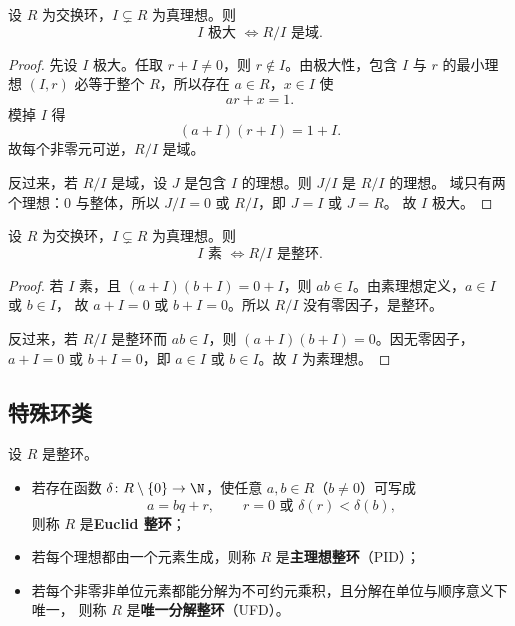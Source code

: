 \begin{theorem}
设 $R$ 为交换环，$I\subsetneq R$ 为真理想。则
\begin{equation}
  I\text{ 极大 } \iff R/I \text{ 是域}.
\end{equation}
\end{theorem}

\begin{proof}
先设 $I$ 极大。任取 $r+I\neq 0$，则 $r\notin I$。由极大性，包含 $I$ 与 $r$ 的最小理想
$(I,r)$ 必等于整个 $R$，所以存在 $a\in R$，$x\in I$ 使
\[
  ar+x=1.
\]
模掉 $I$ 得
\[
  (a+I)(r+I)=1+I.
\]
故每个非零元可逆，$R/I$ 是域。

反过来，若 $R/I$ 是域，设 $J$ 是包含 $I$ 的理想。则 $J/I$ 是 $R/I$ 的理想。
域只有两个理想：$0$ 与整体，所以 $J/I=0$ 或 $R/I$，即 $J=I$ 或 $J=R$。
故 $I$ 极大。
\end{proof}

\begin{theorem}
设 $R$ 为交换环，$I\subsetneq R$ 为真理想。则
\begin{equation}
  I\text{ 素 } \iff R/I \text{ 是整环}.
\end{equation}
\end{theorem}

\begin{proof}
若 $I$ 素，且 $(a+I)(b+I)=0+I$，则 $ab\in I$。由素理想定义，$a\in I$ 或 $b\in I$，
故 $a+I=0$ 或 $b+I=0$。所以 $R/I$ 没有零因子，是整环。

反过来，若 $R/I$ 是整环而 $ab\in I$，则 $(a+I)(b+I)=0$。因无零因子，
$a+I=0$ 或 $b+I=0$，即 $a\in I$ 或 $b\in I$。故 $I$ 为素理想。
\end{proof}

\subsection{特殊环类}

\begin{definition}
设 $R$ 是整环。
\begin{itemize}
  \item 若存在函数 $\delta\colon R\setminus\{0\}\to\N$，使任意 $a,b\in R$（$b\neq 0$）可写成
  \[
    a=bq+r, \qquad r=0\text{ 或 }\delta(r)<\delta(b),
  \]
  则称 $R$ 是\textbf{Euclid 整环}；
  \item 若每个理想都由一个元素生成，则称 $R$ 是\textbf{主理想整环}（PID）；
  \item 若每个非零非单位元素都能分解为不可约元乘积，且分解在单位与顺序意义下唯一，
  则称 $R$ 是\textbf{唯一分解整环}（UFD）。
\end{itemize}
\end{definition}

